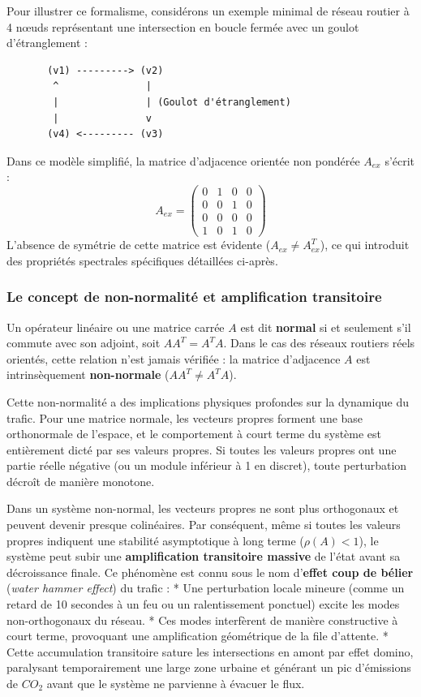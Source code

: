 \documentclass[10pt, a4paper]{article}
\begin{document}
Pour illustrer ce formalisme, considérons un exemple minimal de réseau
routier à 4 nœuds représentant une intersection en boucle fermée avec un
goulot d'étranglement :

\begin{verbatim}
       (v1) ---------> (v2)
        ^               |
        |               | (Goulot d'étranglement)
        |               v
       (v4) <--------- (v3)
\end{verbatim}

Dans ce modèle simplifié, la matrice d'adjacence orientée non pondérée
\(A_{ex}\) s'écrit : \[A_{ex} = \begin{pmatrix}
0 & 1 & 0 & 0 \\
0 & 0 & 1 & 0 \\
0 & 0 & 0 & 0 \\
1 & 0 & 1 & 0
\end{pmatrix}\] L'absence de symétrie de cette matrice est évidente
(\(A_{ex} \neq A_{ex}^T\)), ce qui introduit des propriétés spectrales
spécifiques détaillées ci-après.

\subsubsection{Le concept de non-normalité et amplification
transitoire}\label{le-concept-de-non-normalituxe9-et-amplification-transitoire}

Un opérateur linéaire ou une matrice carrée \(A\) est dit
\textbf{normal} si et seulement s'il commute avec son adjoint, soit
\(A A^T = A^T A\). Dans le cas des réseaux routiers réels orientés,
cette relation n'est jamais vérifiée : la matrice d'adjacence \(A\) est
intrinsèquement \textbf{non-normale} (\(A A^T \neq A^T A\)).

Cette non-normalité a des implications physiques profondes sur la
dynamique du trafic. Pour une matrice normale, les vecteurs propres
forment une base orthonormale de l'espace, et le comportement à court
terme du système est entièrement dicté par ses valeurs propres. Si
toutes les valeurs propres ont une partie réelle négative (ou un module
inférieur à 1 en discret), toute perturbation décroît de manière
monotone.

Dans un système non-normal, les vecteurs propres ne sont plus
orthogonaux et peuvent devenir presque colinéaires. Par conséquent, même
si toutes les valeurs propres indiquent une stabilité asymptotique à
long terme (\(\rho(A) < 1\)), le système peut subir une
\textbf{amplification transitoire massive} de l'état avant sa
décroissance finale. Ce phénomène est connu sous le nom d'\textbf{effet
coup de bélier} (\emph{water hammer effect}) du trafic : * Une
perturbation locale mineure (comme un retard de 10 secondes à un feu ou
un ralentissement ponctuel) excite les modes non-orthogonaux du réseau.
* Ces modes interfèrent de manière constructive à court terme,
provoquant une amplification géométrique de la file d'attente. * Cette
accumulation transitoire sature les intersections en amont par effet
domino, paralysant temporairement une large zone urbaine et générant un
pic d'émissions de \(CO_2\) avant que le système ne parvienne à évacuer
le flux.
\end{document}
